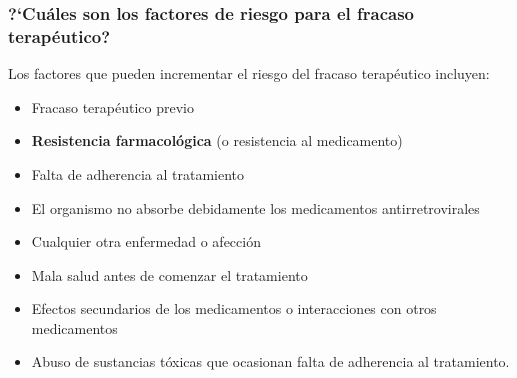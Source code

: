   \subsubsection{?`Cu\'ales son los factores de riesgo para el fracaso terap\'eutico?}
  Los factores que pueden incrementar el riesgo del fracaso terap\'eutico incluyen:
  \begin{itemize}
    \item Fracaso terap\'eutico previo
    \item \textbf{Resistencia farmacol\'ogica} (o resistencia al medicamento)
    \item Falta de adherencia al tratamiento
    \item El organismo no absorbe debidamente los medicamentos antirretrovirales
    \item Cualquier otra enfermedad o afecci\'on
    \item Mala salud antes de comenzar el tratamiento
    \item Efectos secundarios de los medicamentos o interacciones con otros medicamentos
    \item Abuso de sustancias t\'oxicas que ocasionan falta de adherencia al tratamiento.
  \end{itemize}

